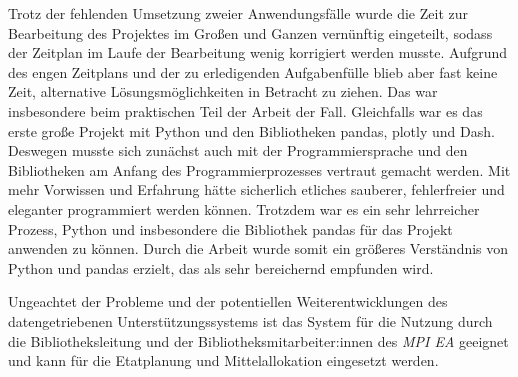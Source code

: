 Trotz der fehlenden Umsetzung zweier Anwendungsfälle wurde die Zeit zur Bearbeitung des Projektes im Großen und Ganzen vernünftig eingeteilt, 
sodass der Zeitplan im Laufe der Bearbeitung wenig korrigiert werden musste. Aufgrund des engen Zeitplans und der zu erledigenden Aufgabenfülle
blieb aber fast keine Zeit, alternative Lösungsmöglichkeiten in Betracht zu ziehen. 
Das war insbesondere beim praktischen Teil der Arbeit der Fall. Gleichfalls war es das erste große Projekt mit Python und den Bibliotheken pandas, plotly und Dash.
Deswegen musste sich zunächst auch mit der Programmiersprache und den Bibliotheken am Anfang des Programmierprozesses vertraut gemacht werden.
Mit mehr Vorwissen und Erfahrung hätte sicherlich etliches sauberer, fehlerfreier und eleganter programmiert werden können. 
Trotzdem war es ein sehr lehrreicher Prozess, Python und insbesondere die Bibliothek pandas für das Projekt anwenden zu können. 
Durch die Arbeit wurde somit ein größeres Verständnis von Python und pandas erzielt, das als sehr bereichernd empfunden wird.


Ungeachtet der Probleme und der potentiellen Weiterentwicklungen des datengetriebenen Unterstützungssystems ist das System für die Nutzung durch die Bibliotheksleitung und der Bibliotheksmitarbeiter:innen des \textit{\acrlong{MPI EA}} 
geeignet und kann für die Etatplanung und Mittelallokation eingesetzt werden.